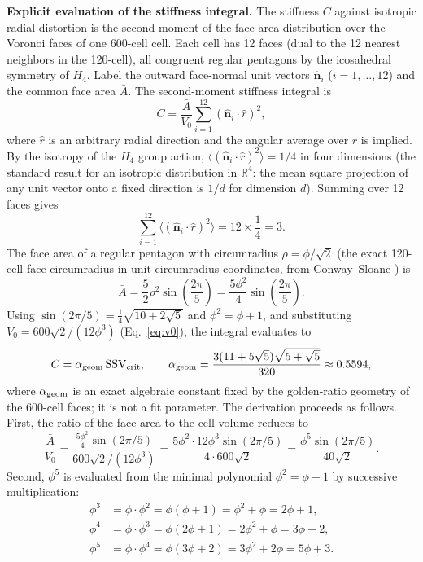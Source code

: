 \documentclass[11pt,letterpaper]{article}
\begin{document}
\textbf{Explicit evaluation of the stiffness integral.}
The stiffness $C$ against isotropic radial distortion is the second moment of the face-area distribution over the Voronoi faces of one 600-cell cell. Each 
cell has 12 faces (dual to the 12 nearest neighbors in the 120-cell), all congruent regular pentagons by the icosahedral symmetry of $H_4$. Label the 
outward face-normal unit vectors $\hat{\mathbf{n}}_i$ ($i = 1,\ldots,12$) and the common face area $\bar{A}$. The second-moment stiffness integral is
\begin{equation}
C = \frac{\bar{A}}{V_0} \sum_{i=1}^{12} (\hat{\mathbf{n}}_i \cdot \hat{r})^2,
\label{eq:C_secondmoment}
\end{equation}
where $\hat{r}$ is an arbitrary radial direction and the angular average over $\hat{r}$ is implied. By the isotropy of the $H_4$ group action, 
$\langle(\hat{\mathbf{n}}_i \cdot \hat{r})^2\rangle = 1/4$ in four dimensions (the standard result for an isotropic distribution in $\mathbb{R}^4$: the mean 
square projection of any unit vector onto a fixed direction is $1/d$ for dimension $d$). Summing over 12 faces gives
\[
\sum_{i=1}^{12} \langle(\hat{\mathbf{n}}_i \cdot \hat{r})^2\rangle = 
12 \times \frac{1}{4} = 3.
\]
The face area of a regular pentagon with circumradius $\rho = \phi/\sqrt{2}$ 
(the exact 120-cell face circumradius in unit-circumradius coordinates, from 
Conway--Sloane \cite{conway1988}) is
\[
\bar{A} = \frac{5}{2}\rho^2 \sin\!\left(\frac{2\pi}{5}\right) 
= \frac{5\phi^2}{4}\sin\!\left(\frac{2\pi}{5}\right).
\]
Using $\sin(2\pi/5) = \tfrac{1}{4}\sqrt{10 + 2\sqrt{5}}$ and 
$\phi^2 = \phi + 1$, and substituting $V_0 = 600\sqrt{2}/(12\phi^3)$ 
(Eq.~\ref{eq:v0}), the integral evaluates to
\begin{equation}
C = \alpha_{\rm geom}\,\text{SSV}_{\rm crit}, \qquad
\alpha_{\rm geom} = \frac{3(11+5\sqrt{5})\sqrt{5+\sqrt{5}}}{320}
\approx 0.5594,
\label{eq:C_result}
\end{equation}
where $\alpha_{\rm geom}$ is an exact algebraic constant fixed by the
golden-ratio geometry of the 600-cell faces; it is not a fit parameter.
The derivation proceeds as follows. First, the ratio of the face area
to the cell volume reduces to
\[
\frac{\bar{A}}{V_0} = \frac{\tfrac{5\phi^2}{4}\sin(2\pi/5)}
{600\sqrt{2}/(12\phi^3)} 
= \frac{5\phi^2 \cdot 12\phi^3 \sin(2\pi/5)}{4 \cdot 600\sqrt{2}}
= \frac{\phi^5 \sin(2\pi/5)}{40\sqrt{2}}.
\]
Second, $\phi^5$ is evaluated from the minimal polynomial 
$\phi^2 = \phi + 1$ by successive multiplication:
\begin{align*}
\phi^3 &= \phi\cdot\phi^2 = \phi(\phi+1) = \phi^2+\phi = 2\phi+1, \\
\phi^4 &= \phi\cdot\phi^3 = \phi(2\phi+1) = 2\phi^2+\phi = 3\phi+2, \\
\phi^5 &= \phi\cdot\phi^4 = \phi(3\phi+2) = 3\phi^2+2\phi = 5\phi+3.
\end{align*}
\end{document}
